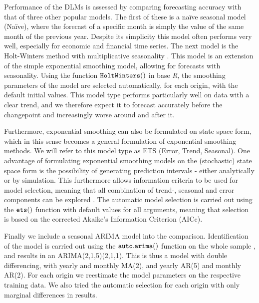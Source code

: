 \documentclass[12pt, a4paper]{article}
\begin{document}
Performance of the DLMs is assessed by comparing forecasting accuracy
with that of three other popular models. The first of these is a naïve
seasonal model (Naïve), where the forecast of a specific month is simply
the value of the same month of the previous year. Despite its simplicity
this model often performs very well, especially for economic and financial time series. The next model is the Holt-Winters method with
multiplicative seasonality
\citep{holt2004forecasting, winters1960forecasting}. This model is an
extension of the simple exponential smoothing model, allowing for
forecasts with seasonality. Using the function ${\tt HoltWinters()}$ in
base \emph{R}, the smoothing parameters of the model are selected
automatically, for each origin, with the default initial values. This
model type performs particularly well on data with a clear trend, and we
therefore expect it to forecast accurately before the changepoint and
increasingly worse around and after it.

Furthermore, exponential smoothing can also be formulated on state space
form, which in this sense becomes a general formulation of exponential smoothing
methods. We will refer to this model type as ETS (Error, Trend,
Seasonal). One advantage of formulating exponential smoothing models on the
(stochastic) state space form is the possibility of generating prediction
intervals - either analytically or by simulation. This furthermore
allows information criteria to be used for model selection, meaning that
all combination of trend-, seasonal and error components can be explored
\citep{hyndman2002state}. The automatic model selection is carried out
using the ${\tt ets()}$ function with default values for all
arguments, meaning that selection is based on the corrected Akaike's
Information Criterion (AICc).

Finally we include a seasonal ARIMA model into the comparison.
Identification of the model is carried out using the
${\tt auto.arima()}$ function on the whole sample \citep{hyndman2019},
and results in an ARIMA(2,1,5)(2,1,1). This is thus a model with double
differencing, with yearly and monthly MA(2), and yearly AR(5) and
monthly AR(2). For each origin we reestimate the model parameters on the
respective training data. We also tried the automatic selection for each
origin with only marginal differences in results.
\end{document}
